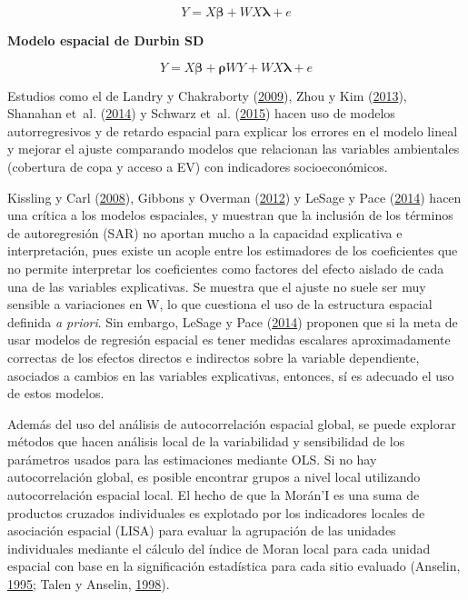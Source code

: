 \documentclass[12pt,a4paper,openany]{book}
\theoremstyle{definition}
\theoremstyle{definition}
\theoremstyle{definition}
\theoremstyle{remark}
\begin{document}
\begin{equation}
Y=X\mathbf{\beta}+WX\mathbf{\lambda}+e
\label{eq:slx}
\end{equation}

\textbf{Modelo espacial de Durbin SD}

\begin{equation}
Y=X\mathbf{\beta}+\mathbf{\rho}WY+WX\mathbf{\lambda}+e
\label{eq:sd}
\end{equation}

Estudios como el de Landry y Chakraborty
(\protect\hyperlink{ref-landry_street_2009}{2009}), Zhou y Kim
(\protect\hyperlink{ref-zhou_social_2013}{2013}), Shanahan et~al.
(\protect\hyperlink{ref-shanahan_socio-economic_2014}{2014}) y Schwarz
et~al. (\protect\hyperlink{ref-schwarz_trees_2015}{2015}) hacen uso de
modelos autorregresivos y de retardo espacial para explicar los errores
en el modelo lineal y mejorar el ajuste comparando modelos que
relacionan las variables ambientales (cobertura de copa y acceso a EV)
con indicadores socioeconómicos.

Kissling y Carl (\protect\hyperlink{ref-kissling_spatial_2008}{2008}),
Gibbons y Overman (\protect\hyperlink{ref-gibbons_mostly_2012}{2012}) y
LeSage y Pace (\protect\hyperlink{ref-lesage_biggest_2014}{2014}) hacen
una crítica a los modelos espaciales, y muestran que la inclusión de los
términos de autoregresión (SAR) no aportan mucho a la capacidad
explicativa e interpretación, pues existe un acople entre los
estimadores de los coeficientes que no permite interpretar los
coeficientes como factores del efecto aislado de cada una de las
variables explicativas. Se muestra que el ajuste no suele ser muy
sensible a variaciones en W, lo que cuestiona el uso de la estructura
espacial definida \emph{a priori}. Sin embargo, LeSage y Pace
(\protect\hyperlink{ref-lesage_biggest_2014}{2014}) proponen que si la
meta de usar modelos de regresión espacial es tener medidas escalares
aproximadamente correctas de los efectos directos e indirectos sobre la
variable dependiente, asociados a cambios en las variables explicativas,
entonces, sí es adecuado el uso de estos modelos.

Además del uso del análisis de autocorrelación espacial global, se puede
explorar métodos que hacen análisis local de la variabilidad y
sensibilidad de los parámetros usados para las estimaciones mediante
OLS. Si no hay autocorrelación global, es posible encontrar grupos a
nivel local utilizando autocorrelación espacial local. El hecho de que
la Morán'I es una suma de productos cruzados individuales es explotado
por los indicadores locales de asociación espacial (LISA) para evaluar
la agrupación de las unidades individuales mediante el cálculo del
índice de Moran local para cada unidad espacial con base en la
significación estadística para cada sitio evaluado (Anselin,
\protect\hyperlink{ref-anselin1995local}{1995}; Talen y Anselin,
\protect\hyperlink{ref-talen_assessing_1998}{1998}).
\end{document}
